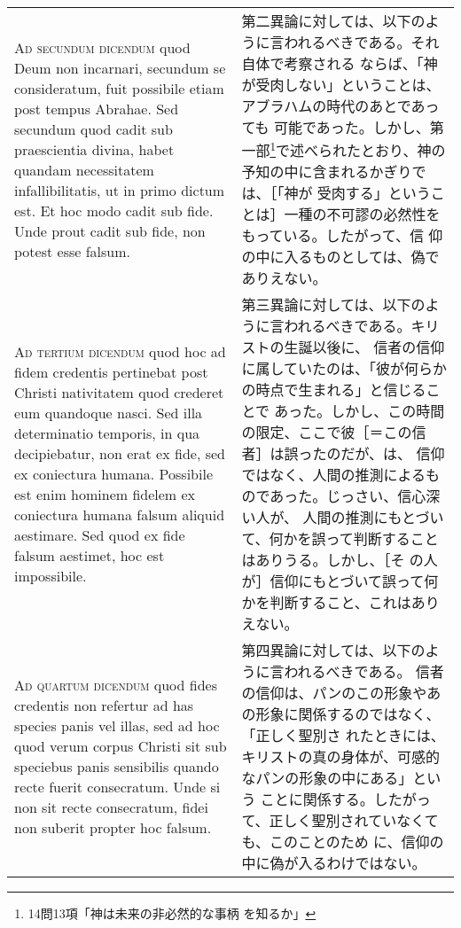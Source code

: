 \documentclass[10pt]{jsarticle} %
\begin{document}
\begin{longtable}{p{21em}p{21em}}
\\

{\scshape Ad secundum dicendum} quod Deum non
incarnari, secundum se consideratum, fuit possibile etiam post tempus
Abrahae. Sed secundum quod cadit sub praescientia divina, habet quandam
necessitatem infallibilitatis, ut in primo dictum est. Et hoc modo cadit
sub fide. Unde prout cadit sub fide, non potest esse falsum.

&


第二異論に対しては、以下のように言われるべきである。それ自体で考察される
ならば、「神が受肉しない」ということは、アブラハムの時代のあとであっても
可能であった。しかし、第一部\footnote{14問13項「神は未来の非必然的な事柄
を知るか」}で述べられたとおり、神の予知の中に含まれるかぎりでは、［「神が
受肉する」ということは］一種の不可謬の必然性をもっている。したがって、信
仰の中に入るものとしては、偽でありえない。

\\


{\scshape Ad tertium dicendum} quod hoc ad fidem
credentis pertinebat post Christi nativitatem quod crederet eum
quandoque nasci. Sed illa determinatio temporis, in qua decipiebatur,
non erat ex fide, sed ex coniectura humana. Possibile est enim hominem
fidelem ex coniectura humana falsum aliquid aestimare. Sed quod ex fide
falsum aestimet, hoc est impossibile.

& 

第三異論に対しては、以下のように言われるべきである。キリストの生誕以後に、
信者の信仰に属していたのは、「彼が何らかの時点で生まれる」と信じることで
あった。しかし、この時間の限定、ここで彼［＝この信者］は誤ったのだが、は、
信仰ではなく、人間の推測によるものであった。じっさい、信心深い人が、
人間の推測にもとづいて、何かを誤って判断することはありうる。しかし、［そ
の人が］信仰にもとづいて誤って何かを判断すること、これはありえない。

\\


{\scshape Ad quartum dicendum} quod fides credentis
non refertur ad has species panis vel illas, sed ad hoc quod verum
corpus Christi sit sub speciebus panis sensibilis quando recte fuerit
consecratum. Unde si non sit recte consecratum, fidei non suberit
propter hoc falsum.

&

第四異論に対しては、以下のように言われるべきである。
信者の信仰は、パンのこの形象やあの形象に関係するのではなく、「正しく聖別さ
 れたときには、キリストの真の身体が、可感的なパンの形象の中にある」という
 ことに関係する。したがって、正しく聖別されていなくても、このことのため
 に、信仰の中に偽が入るわけではない。



\end{longtable}
\newpage
\end{document}
